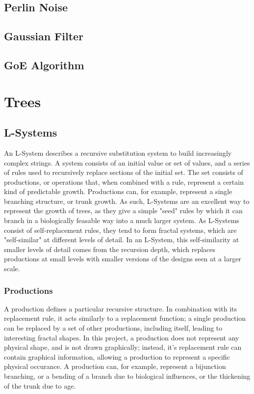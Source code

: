 \documentclass{article}
\newcommand{\tab}{\hspace*{2em}}
\begin{document}
        \subsection{Perlin Noise}

        \subsection{Gaussian Filter}

        \subsection{GoE Algorithm}

    \section{Trees}
        \subsection{L-Systems}
    \tab An L-System describes a recursive substitution system to build increasingly complex
strings. A system consists of an initial value or set of values, and a series of rules used to
recursively replace sections of the initial set. The set consists of productions, or operations
that, when combined with a rule, represent a certain kind of predictable growth. Productions can,
for example, represent a single branching structure, or trunk growth. As such, L-Systems are an
excellent way to represent the growth of trees, as they give a simple "seed" rules by which it can
branch in a biologically feasable way into a much larger system. As L-Systems consist of
self-replacement rules, they tend to form fractal systems, which are "self-similar" at different
levels of detail. In an L-System, this self-similarity at smaller levels of detail comes from the
recursion depth, which replaces productions at small levels with smaller versions of the designs
seen at a larger scale.


            \subsubsection{Productions}
    \tab A production defines a particular recursive structure. In combination with its replacement
rule, it acts similarly to a replacement function; a single production can be replaced by a set of
other productions, including itself, leading to interesting fractal shapes. In this project, a
production does not represent any physical shape, and is not drawn graphically; instead, it's 
replacement rule can contain graphical information, allowing a production to represent a specific
physical occurance. A production can, for example, represent a bijunction branching, or a bending
of a branch due to biological influences, or the thickening of the trunk due to age.
\end{document}
